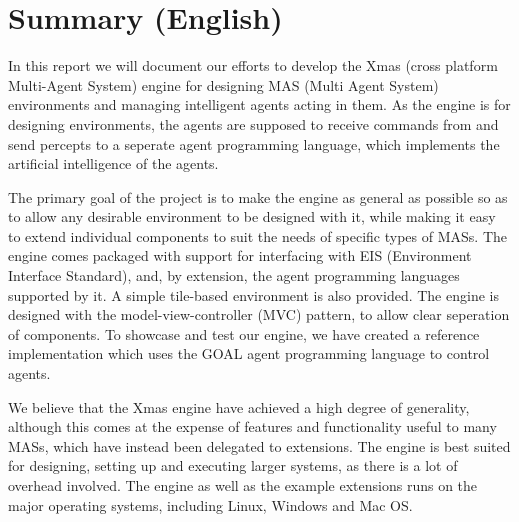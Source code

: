 \chapter{Summary (English)}

In this report we will document our efforts to develop the Xmas (cross platform Multi-Agent System) engine for designing MAS (Multi Agent System) environments and managing intelligent agents acting in them. As the engine is for designing environments, the agents are supposed to receive commands from and send percepts to a seperate agent programming language, which implements the artificial intelligence of the agents. 

The primary goal of the project is to make the engine as general as possible so as to allow any desirable environment to be designed with it, while making it easy to extend individual components to suit the needs of specific types of MASs. The engine comes packaged with support for interfacing with EIS (Environment Interface Standard), and, by extension, the agent programming languages supported by it. A simple tile-based environment is also provided. The engine is designed with the model-view-controller (MVC) pattern, to allow clear seperation of components. To showcase and test our engine, we have created a reference implementation which uses the GOAL agent programming language to control agents.

We believe that the Xmas engine have achieved a high degree of generality, although this comes at the expense of features and functionality useful to many MASs, which have instead been delegated to extensions. The engine is best suited for designing, setting up and executing larger systems, as there is a lot of overhead involved. The engine as well as the example extensions runs on the major operating systems, including Linux, Windows and Mac OS.